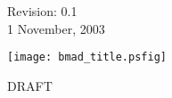 \thispagestyle{empty}

\begin{flushright}
\large
  Revision: 0.1 \\
  1 November, 2003 \\
\end{flushright}

\vfill

{
\begin{center}
\texttt{[image: bmad\_title.psfig]} \\
\end{center}
}

\vskip 1in
\begin{center}
\Huge DRAFT
\end{center}
\vfill
\break